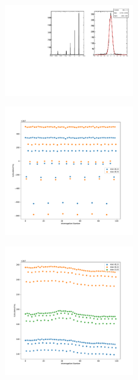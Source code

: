 \begin{figure}[]
\centering
\includegraphics[width=0.5\textwidth]{images/(3,3).pdf}
\caption{}
\end{figure}

\begin{figure}[]
\centering
\includegraphics[width=0.5\textwidth]{images/fast_example.pdf}
\caption{}
\end{figure}

\begin{figure}[]
\centering
\includegraphics[width=0.5\textwidth]{images/slow_example.pdf}
\caption{}
\end{figure}









